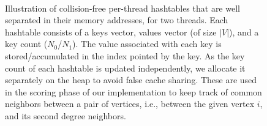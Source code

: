 \begin{figure}[hbtp]
  \centering
   \\[-2ex]
  \caption{Illustration of collision-free per-thread hashtables that are well separated in their memory addresses, for two threads. Each hashtable consists of a keys vector, values vector (of size $|V|$), and a key count ($N_0$/$N_1$). The value associated with each key is stored/accumulated in the index pointed by the key. As the key count of each hashtable is updated independently, we allocate it separately on the heap to avoid false cache sharing. These are used in the scoring phase of our implementation to keep track of common neighbors between a pair of vertices, i.e., between the given vertex $i$, and its second degree neighbors.}
  \label{fig:about-hashtable}
\end{figure}
